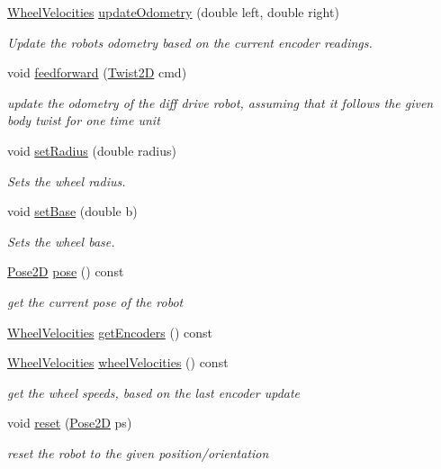 \begin{DoxyCompactItemize}
\hyperlink{structrigid2d_1_1WheelVelocities}{Wheel\+Velocities} \hyperlink{classrigid2d_1_1DiffDrive_aa037844753d585eca7023bfd935e084b}{update\+Odometry} (double left, double right)
\begin{DoxyCompactList}\small\item\em Update the robot\textquotesingle{}s odometry based on the current encoder readings. \end{DoxyCompactList}\item 
void \hyperlink{classrigid2d_1_1DiffDrive_a09e8b9b8fe6539b75bb08f1b71242b7c}{feedforward} (\hyperlink{structrigid2d_1_1Twist2D}{Twist2D} cmd)
\begin{DoxyCompactList}\small\item\em update the odometry of the diff drive robot, assuming that it follows the given body twist for one time unit \end{DoxyCompactList}\item 
void \hyperlink{classrigid2d_1_1DiffDrive_adc465e5cf9027ffb207a3775800d2033}{set\+Radius} (double radius)
\begin{DoxyCompactList}\small\item\em Sets the wheel radius. \end{DoxyCompactList}\item 
void \hyperlink{classrigid2d_1_1DiffDrive_aed9b82741312243d9ea1f705afc372dc}{set\+Base} (double b)
\begin{DoxyCompactList}\small\item\em Sets the wheel base. \end{DoxyCompactList}\item 
\hyperlink{structrigid2d_1_1Pose2D}{Pose2D} \hyperlink{classrigid2d_1_1DiffDrive_a3af583df8981ddfb338bba07b7297ff2}{pose} () const
\begin{DoxyCompactList}\small\item\em get the current pose of the robot \end{DoxyCompactList}\item 
\hyperlink{structrigid2d_1_1WheelVelocities}{Wheel\+Velocities} \hyperlink{classrigid2d_1_1DiffDrive_add7b4cb6d5e4edaffdcefbfa930a2f43}{get\+Encoders} () const
\item 
\hyperlink{structrigid2d_1_1WheelVelocities}{Wheel\+Velocities} \hyperlink{classrigid2d_1_1DiffDrive_a4153bdc614be0535b88d5e43461df7dc}{wheel\+Velocities} () const
\begin{DoxyCompactList}\small\item\em get the wheel speeds, based on the last encoder update \end{DoxyCompactList}\item 
void \hyperlink{classrigid2d_1_1DiffDrive_afffa18508c27b368767182dba1a7d367}{reset} (\hyperlink{structrigid2d_1_1Pose2D}{Pose2D} ps)
\begin{DoxyCompactList}\small\item\em reset the robot to the given position/orientation \end{DoxyCompactList}\end{DoxyCompactItemize}


